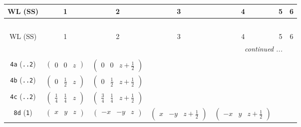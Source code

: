 \documentclass[fleqn,9pt,landscape]{jsarticle}
\begin{document}
\begin{center}
\renewcommand{\arraystretch}{1.2}
\begin{longtable}{ccccccc}
 \hline \hline
WL (SS) & 1 & 2 & 3 & 4 & 5 & 6 \\ \hline \endfirsthead

\multicolumn{6}{l}{\tablename\ \thetable{}} \\
 \hline \hline
WL (SS) & 1 & 2 & 3 & 4 & 5 & 6 \\ \hline \endhead

 \hline \hline
\multicolumn{6}{r}{\footnotesize\it continued ...} \\ \endfoot

 \hline \hline
\multicolumn{6}{r}{} \\ \endlastfoot

{\tt 4a} ({\tt ..2}) & $ \begin{pmatrix} 0 & 0 & z \end{pmatrix} $ & $ \begin{pmatrix} 0 & 0 & z + \frac{1}{2} \end{pmatrix} $ & $  $ & $  $ \\ \hline
{\tt 4b} ({\tt ..2}) & $ \begin{pmatrix} 0 & \frac{1}{2} & z \end{pmatrix} $ & $ \begin{pmatrix} 0 & \frac{1}{2} & z + \frac{1}{2} \end{pmatrix} $ & $  $ & $  $ \\ \hline
{\tt 4c} ({\tt ..2}) & $ \begin{pmatrix} \frac{1}{4} & \frac{1}{4} & z \end{pmatrix} $ & $ \begin{pmatrix} \frac{3}{4} & \frac{1}{4} & z + \frac{1}{2} \end{pmatrix} $ & $  $ & $  $ \\ \hline
{\tt 8d} ({\tt 1}) & $ \begin{pmatrix} x & y & z \end{pmatrix} $ & $ \begin{pmatrix} - x & - y & z \end{pmatrix} $ & $ \begin{pmatrix} x & - y & z + \frac{1}{2} \end{pmatrix} $ & $ \begin{pmatrix} - x & y & z + \frac{1}{2} \end{pmatrix} $ \\
\end{longtable}
\end{center}
\end{document}
